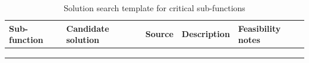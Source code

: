 
\begin{table}[htbp]
\centering
\caption{Solution search template for critical sub-functions}
\label{tab:session9-solution-template}
\renewcommand{\arraystretch}{1.2}
\begin{tabularx}{\textwidth}{|>{\raggedright\arraybackslash}p{}|>{\raggedright\arraybackslash}p{}|>{\raggedright\arraybackslash}p{}|X|>{\raggedright\arraybackslash}p{}|}
\hline
\textbf{Sub-function} & \textbf{Candidate solution} & \textbf{Source} & \textbf{Description} & \textbf{Feasibility notes} \\
\hline
 &  &  &  &  \\
\hline
 &  &  &  &  \\
\hline
 &  &  &  &  \\
\hline
\end{tabularx}
\end{table}